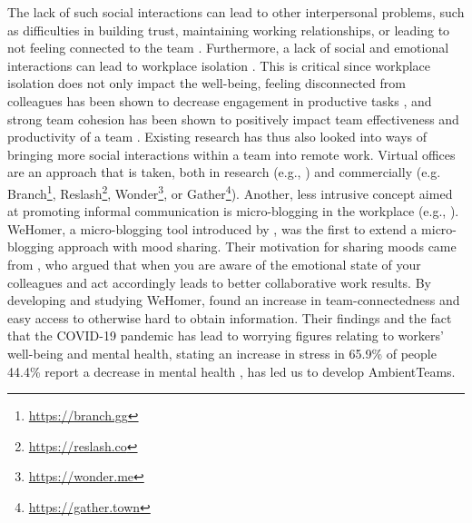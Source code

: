 The lack of such social interactions can lead to other interpersonal problems, such as difficulties in building trust, maintaining working relationships, or leading to not feeling connected to the team \autocite{comella2020revisiting, olson2006bridging}. Furthermore, a lack of social and emotional interactions can lead to workplace isolation \autocite{marshall2007workplace, gorlick2020productivity, mulki2009set}. This is critical since workplace isolation does not only impact the well-being, feeling disconnected from colleagues has been shown to decrease engagement in productive tasks \autocite{lostFocus2020}, and strong team cohesion has been shown to positively impact team effectiveness and productivity of a team \autocite{carlson2017virtual}. Existing research has thus also looked into ways of bringing more social interactions within a team into remote work. Virtual offices are an approach that is taken, both in research (e.g., \autocite{sasaki1999video, lou2012presencescape}) and commercially (e.g. Branch\footnote{\url{https://branch.gg}}, Reslash\footnote{\url{https://reslash.co}}, Wonder\footnote{\url{https://wonder.me}}, or Gather\footnote{\url{https://gather.town}}). Another, less intrusive concept aimed at promoting informal communication is micro-blogging in the workplace (e.g., \autocite{ebner2008microblogging, ehrlich2010microblogging, zhang2010case, dullemond2013fixing}). WeHomer, a micro-blogging tool introduced by \textcite{dullemond2013fixing}, was the first to extend a micro-blogging approach with mood sharing. Their motivation for sharing moods came from \textcite{garcia1999emotional}, who argued that when you are aware of the emotional state of your colleagues and act accordingly leads to better collaborative work results. By developing and studying WeHomer, \textcite{dullemond2013fixing} found an increase in team-connectedness and easy access to otherwise hard to obtain information. Their findings and the fact that the COVID-19 pandemic has lead to worrying figures relating to workers' well-being and mental health, stating an increase in stress in 65.9\% of people 44.4\% report a decrease in mental health \autocite{mswellbeing}, has led us to develop AmbientTeams.

